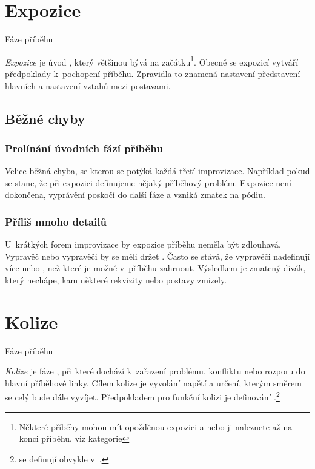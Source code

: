\needspace{5cm} \section{Expozice} \label{expozice} {{Fáze příběhu}} 
 
\textit{Expozice} je úvod , který většinou bývá na začátku\footnote{Některé příběhy mohou mít opožděnou expozici a nebo ji naleznete až na konci příběhu. viz kategorie }. Obecně se expozicí vytváří předpoklady k~pochopení příběhu. Zpravidla to znamená nastavení  představení hlavních  a nastavení vztahů mezi postavami. 
 
\subsection{ Běžné chyby }  
\subsubsection{ Prolínání úvodních fází příběhu } Velice běžná chyba, se kterou se potýká každá třetí improvizace. Například pokud se stane, že při expozici definujeme nějaký příběhový problém. Expozice není dokončena, vyprávění poskočí do další fáze a vzniká zmatek na pódiu. 
 
\subsubsection{ Příliš mnoho detailů } U~krátkých forem improvizace by expozice příběhu neměla být zdlouhavá. Vypravěč nebo vypravěči by se měli držet . Často se stává, že vypravěči nadefinují více  nebo , než které je možné v~příběhu zahrnout. Výsledkem je zmatený divák, který nechápe, kam některé rekvizity nebo postavy zmizely. 
 
  
 
 
 
\needspace{5cm} \section{Kolize} \label{kolize} {{Fáze příběhu}} 
 
\textit{Kolize} je fáze , při které dochází k~zařazení problému, konfliktu nebo rozporu do hlavní příběhové linky. Cílem kolize je vyvolání napětí a určení, kterým směrem se celý  bude dále vyvíjet. Předpokladem pro funkční kolizi je definování .\footnote{ se definují obvykle v~.} 
 
